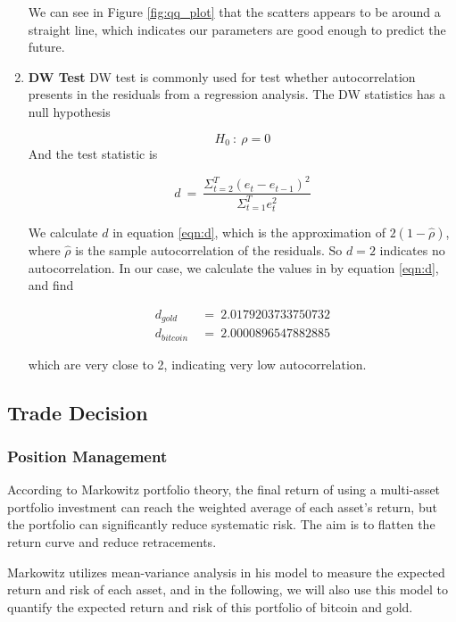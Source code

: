 \documentclass[12pt,a4paper]{article}
\begin{document}
\begin{spacing}{1.2}
\begin{enumerate}
	We can see in Figure \ref{fig:qq_plot} that the scatters appears to be around a straight line, which indicates our parameters are good enough to predict the future.
	
	\item \textbf{DW Test}
	DW test is commonly used for test whether autocorrelation presents in the residuals from a regression analysis. The DW statistics has a null hypothesis
	
$$
	H_0 \ : \ \rho = 0	
$$
	And the test statistic is
	
	\begin{equation}\label{eqn:d}
		d \ = \ \frac{\Sigma_{t=2}^T(e_t-e_{t-1})^2}{\Sigma_{t=1}^T e_t^2}
	\end{equation}

	We calculate $d$ in equation \ref{eqn:d}, which is the approximation of $2(1-\hat{\rho})$, where $\hat{\rho}$ is the sample autocorrelation of the residuals. So $d=2$ indicates no autocorrelation. In our case, we calculate the values in by equation \ref{eqn:d}, and find
	
\begin{align*}
	d_{gold} \ &= \ 2.0179203733750732 \\
	d_{bitcoin} \ &= \ 2.0000896547882885
\end{align*}

	which are very close to 2, indicating very low autocorrelation. 
\end{enumerate}

\subsection{Trade Decision}

\subsubsection{Position Management}
\label{sec:pos_management}

According to Markowitz portfolio theory, the final return of using a multi-asset portfolio investment can reach the weighted average of each asset's return, but the portfolio can significantly reduce systematic risk. The aim is to flatten the return curve and reduce retracements.

Markowitz utilizes mean-variance analysis in his model to measure the expected return and risk of each asset, and in the following, we will also use this model to quantify the expected return and risk of this portfolio of bitcoin and gold.


\end{spacing}
\end{document}
